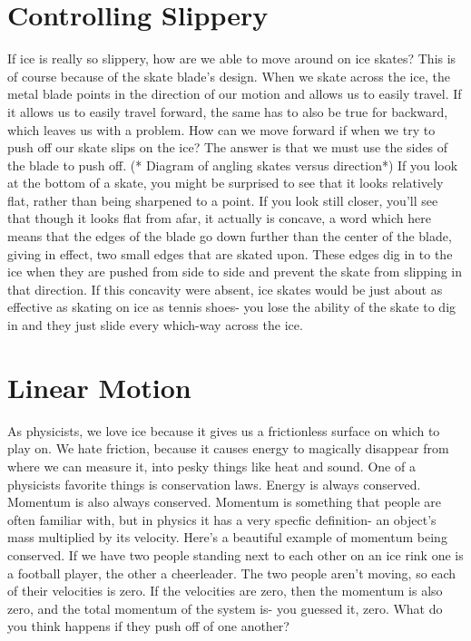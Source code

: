 \documentclass[12pt]{article}
\begin{document}
\section{Controlling Slippery}
If ice is really so slippery, how are we able to move around on ice skates? This is 
of course because of the skate blade's design. When we skate across the ice, the metal blade
points in the direction of our motion and allows us to easily travel. If it allows us to easily 
travel forward, the same has to also be true for backward, which leaves us with a problem. 
How can we move forward if when we try to push off our skate slips on the ice? The answer
is that we must use the sides of the blade to push off. (* Diagram of angling skates versus 
direction*) 
If you look at the bottom of a skate, you might be surprised to see that it looks relatively
flat, rather than being sharpened to a point. If you look still closer, you'll see that 
though it looks flat from afar, it actually is concave, a word which here means that the
edges of the blade go down further than the center of the blade, giving in effect, two small 
edges that are skated upon. These edges dig in to the ice when they are pushed from side
to side and prevent the skate from slipping in that direction. 
If this concavity were absent, ice skates would be just about as
effective as skating on ice as tennis shoes- you lose the ability of the skate to dig in
and they just slide every which-way across the ice. 

\section{Linear Motion}
As physicists, we love ice because it gives us a frictionless surface on which to play on.
We hate friction, because it causes energy to magically disappear from where we can measure
it, into pesky things like heat and sound. One of a physicists favorite things is conservation 
laws. Energy is always conserved. Momentum is also always conserved. Momentum is something
that people are often familiar with, but in physics it has a very specfic definition-
an object's mass multiplied by its velocity.
Here's a beautiful example of momentum being conserved. If we have two people standing next to each other on 
an ice rink one is a football player, the other a cheerleader. The two people aren't moving,
so each of their velocities is zero. If the velocities are zero, then the momentum is 
also zero, and the total momentum of the system is- you guessed it, zero. 
What do you think happens if they push off of one another? 
\end{document}
